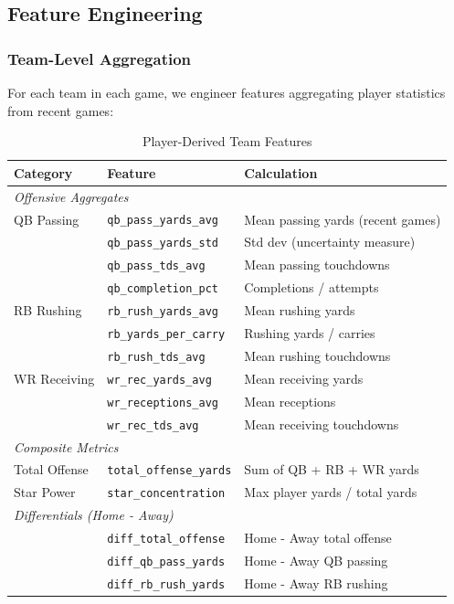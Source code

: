 \subsection{Feature Engineering}

\subsubsection{Team-Level Aggregation}

For each team in each game, we engineer features aggregating player statistics from recent games:

\begin{table}[h]
\centering
\caption{Player-Derived Team Features}
\label{tab:player-features}
\begin{tabular}{lll}
\toprule
\textbf{Category} & \textbf{Feature} & \textbf{Calculation} \\
\midrule
\multicolumn{3}{l}{\textit{Offensive Aggregates}} \\
QB Passing & \texttt{qb\_pass\_yards\_avg} & Mean passing yards (recent games) \\
 & \texttt{qb\_pass\_yards\_std} & Std dev (uncertainty measure) \\
 & \texttt{qb\_pass\_tds\_avg} & Mean passing touchdowns \\
 & \texttt{qb\_completion\_pct} & Completions / attempts \\
\midrule
RB Rushing & \texttt{rb\_rush\_yards\_avg} & Mean rushing yards \\
 & \texttt{rb\_yards\_per\_carry} & Rushing yards / carries \\
 & \texttt{rb\_rush\_tds\_avg} & Mean rushing touchdowns \\
\midrule
WR Receiving & \texttt{wr\_rec\_yards\_avg} & Mean receiving yards \\
 & \texttt{wr\_receptions\_avg} & Mean receptions \\
 & \texttt{wr\_rec\_tds\_avg} & Mean receiving touchdowns \\
\midrule
\multicolumn{3}{l}{\textit{Composite Metrics}} \\
Total Offense & \texttt{total\_offense\_yards} & Sum of QB + RB + WR yards \\
Star Power & \texttt{star\_concentration} & Max player yards / total yards \\
\midrule
\multicolumn{3}{l}{\textit{Differentials (Home - Away)}} \\
 & \texttt{diff\_total\_offense} & Home - Away total offense \\
 & \texttt{diff\_qb\_pass\_yards} & Home - Away QB passing \\
 & \texttt{diff\_rb\_rush\_yards} & Home - Away RB rushing \\
\bottomrule
\end{tabular}
\end{table}

